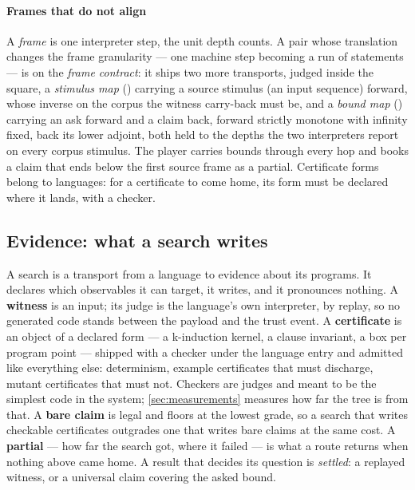 \paragraph{Frames that do not align}
A \emph{frame} is one interpreter step, the unit depth counts. A pair
whose translation changes the frame granularity --- one machine step
becoming a run of statements --- is on the \emph{frame contract}: it
ships two more transports, judged inside the square, a \emph{stimulus
map} () carrying a source stimulus (an input
sequence) forward, whose inverse
on the corpus the witness carry-back must be, and a \emph{bound map}
() carrying an ask forward and a claim back,
forward strictly monotone with infinity fixed, back its lower
adjoint, both held to the depths the two interpreters report on every
corpus stimulus. The player carries bounds through every hop and
books a claim that ends below the first source frame as a partial.
Certificate forms belong to languages: for a certificate to come
home, its form must be declared where it lands, with a checker.

\subsection{Evidence: what a search writes}
\label{sec:evidence}

A search is a transport from a language to evidence about its
programs. It declares which observables it can target, it writes, and
it pronounces nothing. A \textbf{witness} is an input; its judge is
the language's own interpreter, by replay, so no generated code
stands between the payload and the trust event. A
\textbf{certificate} is an object of a declared form --- a
k-induction kernel, a clause invariant, a box per program point ---
shipped with a checker under the language entry and admitted like
everything else: determinism, example certificates that must
discharge, mutant certificates that must not. Checkers are judges and
meant to be the simplest code in the system; \cref{sec:measurements}
measures how far the tree is from that. A \textbf{bare claim} is legal and floors at the
lowest grade, so a search that writes checkable certificates
outgrades one that writes bare claims at the same cost. A
\textbf{partial} --- how far the search got,
where it failed --- is what a route returns when nothing above came
home. A result that decides its question is \emph{settled}: a
replayed witness, or a universal claim covering the asked bound.

